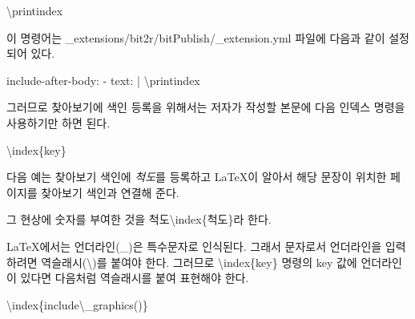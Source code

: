\documentclass[
  letterpaper,
]{book}
\newenvironment{Shaded}{\begin{snugshade}}{\end{snugshade}}
\newcommand{\AttributeTok}[1]{\textcolor[rgb]{0.40,0.45,0.13}{#1}}
\newcommand{\CharTok}[1]{\textcolor[rgb]{0.13,0.47,0.30}{#1}}
\newcommand{\FunctionTok}[1]{\textcolor[rgb]{0.28,0.35,0.67}{#1}}
\newcommand{\KeywordTok}[1]{\textcolor[rgb]{0.00,0.23,0.31}{#1}}
\newcommand{\NormalTok}[1]{\textcolor[rgb]{0.00,0.23,0.31}{#1}}
\begin{document}
\begin{Shaded}
\begin{Highlighting}[]
\FunctionTok{\textbackslash{}printindex}
\end{Highlighting}
\end{Shaded}

이 명령어는 \_extensions/bit2r/bitPublish/\_extension.yml 파일에 다음과
같이 설정되어 있다.

\begin{Shaded}
\begin{Highlighting}[]
\FunctionTok{include{-}after{-}body}\KeywordTok{:}\AttributeTok{  }
\KeywordTok{  {-} }\FunctionTok{text}\KeywordTok{:}\AttributeTok{ }\CharTok{|}\AttributeTok{      }
\NormalTok{      \textbackslash{}printindex  }
\end{Highlighting}
\end{Shaded}

그러므로 찾아보기에 색인 등록을 위해서는 저자가 작성할 본문에 다음
인덱스 명령을 사용하기만 하면 된다.

\begin{Shaded}
\begin{Highlighting}[]
\FunctionTok{\textbackslash{}index}\NormalTok{\{key\}}
\end{Highlighting}
\end{Shaded}

다음 예는 찾아보기 색인에 \emph{척도}를 등록하고 LaTeX이 알아서 해당
문장이 위치한 페이지를 찾아보기 색인과 연결해 준다.

\begin{Shaded}
\begin{Highlighting}[]
\NormalTok{그 현상에 숫자를 부여한 것을 척도}\FunctionTok{\textbackslash{}index}\NormalTok{\{척도\}라 한다.}
\end{Highlighting}
\end{Shaded}

\begin{tcolorbox}[enhanced jigsaw, opacityback=0, opacitybacktitle=0.6, colback=white, rightrule=.15mm, coltitle=black, colframe=quarto-callout-note-color-frame, colbacktitle=quarto-callout-note-color!10!white, bottomrule=.15mm, bottomtitle=1mm, breakable, title=\textcolor{quarto-callout-note-color}{\faInfo}\hspace{0.5em}{찾아보기에서의 언더라인의 표현}, titlerule=0mm, leftrule=.75mm, toptitle=1mm, left=2mm, arc=.35mm, toprule=.15mm]

LaTeX에서는 언더라인(\_)은 특수문자로 인식된다. 그래서 문자로서
언더라인을 입력하려면 역슬래시(\textbackslash)를 붙여야 한다. 그러므로
\textbackslash index\{key\} 명령의 key 값에 언더라인이 있다면 다음처럼
역슬래시를 붙여 표현해야 한다.

\textbackslash index\{include\textbackslash\_graphics()\}

\end{tcolorbox}
\end{document}
